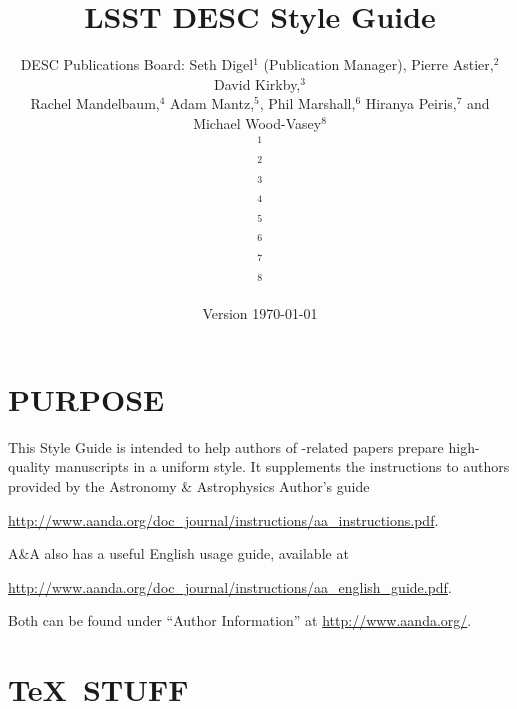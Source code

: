 \documentclass[letterpaper,11pt]{article}
\newcommand*{\version}{Version \today}
\begin{document}

\title{\vspace{5cm}LSST DESC Style Guide}
\author{DESC Publications Board: Seth Digel$^1$ (Publication Manager), Pierre Astier,$^2$ David Kirkby,$^3$\\ Rachel Mandelbaum,$^4$ Adam Mantz,$^5$, Phil Marshall,$^6$ Hiranya Peiris,$^7$ and Michael Wood-Vasey$^8$
  \medskip\\
    {\small$^1$}\\
    {\small$^2$}\\
    {\small$^3$}\\
    {\small$^4$}\\
    {\small$^5$\suphysics}\\
    {\small$^6$}\\
    {\small$^7$}\\
    {\small$^8$}
}
\date{\version}
\maketitle
\thispagestyle{fancy}

\clearpage
\fancyhead{}
\fancyhead[L]{\version}
\fancyhead[R]{\thepage}
\setcounter{page}{1}

\tableofcontents

\clearpage
\fancyhead[C]{\rightmark}
\setcounter{page}{1}

\section{PURPOSE}

This Style Guide is intended to help authors of \Planck-related papers prepare
high-quality manuscripts in a uniform style. It supplements the instructions
to authors provided by the  Astronomy \& Astrophysics Author's guide 

\url{http://www.aanda.org/doc_journal/instructions/aa_instructions.pdf}.

\noindent A\&A also has a useful English usage guide, available at 

\url{http://www.aanda.org/doc_journal/instructions/aa_english_guide.pdf}.

\noindent Both can be found under ``Author Information'' at
\url{http://www.aanda.org/}.


\section{\TeX\ STUFF}
\end{document}
